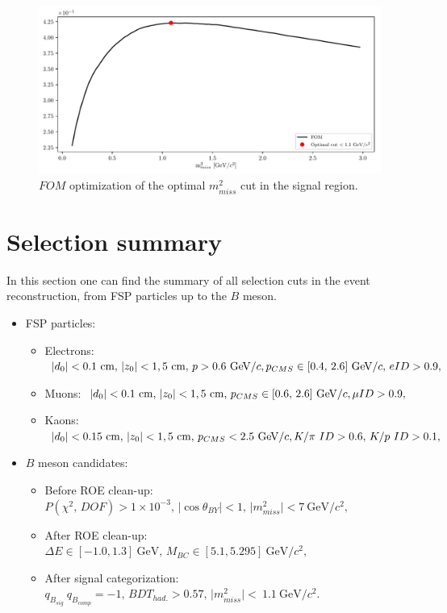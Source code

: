 \documentclass[headings=standardclasses,headings=big,oneside,a4paper,openany,12pt]{scrbook}
\newcommand {\e}[1]{\mathrm{~#1}}
\newcommand {\E}[1]{\times 10^{#1}}
\begin{document}
\begin{figure}[H]
\centering
\captionsetup{width=0.8\linewidth}
\includegraphics[width=\linewidth]{fig/missm2_opt}
\caption{$FOM$ optimization of the optimal $m_{miss}^2$ cut in the signal region.}
\label{fig:missm2opt}
\end{figure}

\section{Selection summary}
\label{s:ss}
In this section one can find the summary of all selection cuts in the event reconstruction, from FSP particles up to the $B$ meson.

\begin{itemize}
\item FSP particles:
	\begin{itemize}
	\item Electrons: $\vert d_0 \vert < 0.1\e{cm},\,\vert z_0 \vert < 1,5\e{cm},\,p>0.6\e{GeV}/c,\\p_{CMS}\in[0.4,\,2.6]\e{GeV}/c,\,eID>0.9,$
    \item Muons: $\vert d_0 \vert < 0.1\e{cm},\,\vert z_0 \vert < 1,5\e{cm},\,p_{CMS}\in[0.6,\,2.6]\e{GeV}/c,\\\mu ID>0.9,$
    \item Kaons: $\vert d_0 \vert < 0.15\e{cm},\,\vert z_0 \vert < 1,5\e{cm},\,p_{CMS} < 2.5\e{GeV}/c,\\K/\pi~ID>0.6,\,K/p~ID>0.1,$
	\end{itemize}
\item $B$ meson candidates:
	\begin{itemize}
	\item Before ROE clean-up: $P(\chi^2,\,DOF) > 1\E{-3},\,\vert \cos \theta_{BY} \vert < 1,\,\vert m_{miss}^2 \vert < 7\e{GeV}/c^2,$
    \item After ROE clean-up: $\Delta E \in [-1.0,1.3]\e{GeV},\,M_{BC} \in [5.1,5.295]\e{GeV}/c^2,$
    \item After signal categorization: $q_{B_{sig}}~q_{B_{comp}} = -1,\,BDT_{had.} > 0.57,\,\vert m_{miss}^2\vert<~1.1\e{GeV}/c^2.$
	\end{itemize}
\end{itemize}
\end{document}

